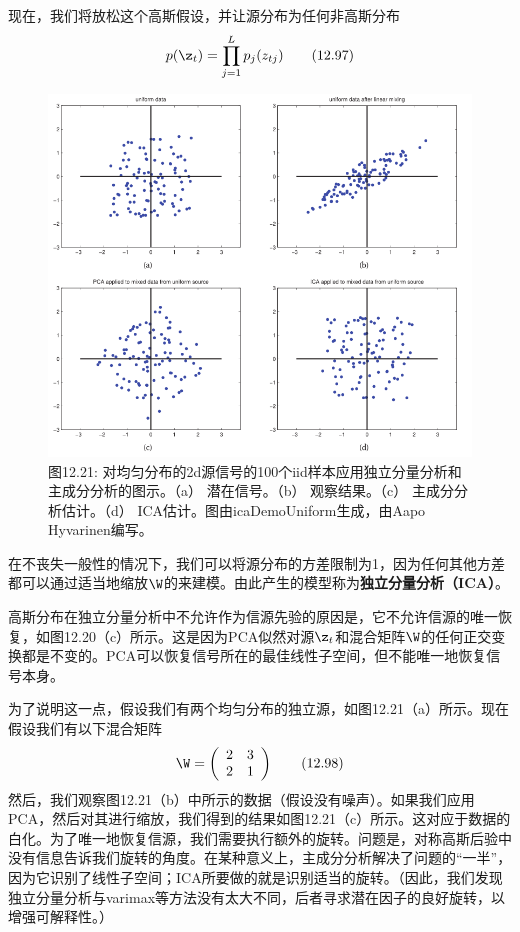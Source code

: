 \documentclass[a4paper]{article}
\begin{document}
现在，我们将放松这个高斯假设，并让源分布为任何非高斯分布
\begin{equation}
	p(\z_t)=\prod_{j=1}^Lp_j(z_{tj})\tag{12.97}
\end{equation}
\begin{figure}[h]
	\centering
	\includegraphics[width=0.7\linewidth]{fig/figure21}
	\caption*{图12.21: 对均匀分布的2d源信号的100个iid样本应用独立分量分析和主成分分析的图示。（a） 潜在信号。（b） 观察结果。（c） 主成分分析估计。（d） ICA估计。图由icaDemoUniform生成，由Aapo Hyvarinen编写。 }
\end{figure}

在不丧失一般性的情况下，我们可以将源分布的方差限制为1，因为任何其他方差都可以通过适当地缩放$\W$的来建模。由此产生的模型称为\textbf{独立分量分析（ICA）}。

高斯分布在独立分量分析中不允许作为信源先验的原因是，它不允许信源的唯一恢复，如图12.20（c）所示。这是因为PCA似然对源$\z_t$和混合矩阵$\W$的任何正交变换都是不变的。PCA可以恢复信号所在的最佳线性子空间，但不能唯一地恢复信号本身。 

为了说明这一点，假设我们有两个均匀分布的独立源，如图12.21（a）所示。现在假设我们有以下混合矩阵 
\begin{equation}
	\W=\left(
	\begin{array}{cccc}
	2 & 3\\
	2 & 1\\
	\end{array}\right)\tag{12.98}
\end{equation}
然后，我们观察图12.21（b）中所示的数据（假设没有噪声）。如果我们应用PCA，然后对其进行缩放，我们得到的结果如图12.21（c）所示。这对应于数据的白化。为了唯一地恢复信源，我们需要执行额外的旋转。问题是，对称高斯后验中没有信息告诉我们旋转的角度。在某种意义上，主成分分析解决了问题的“一半”，因为它识别了线性子空间；ICA所要做的就是识别适当的旋转。（因此，我们发现独立分量分析与varimax等方法没有太大不同，后者寻求潜在因子的良好旋转，以增强可解释性。） 
\end{document}
